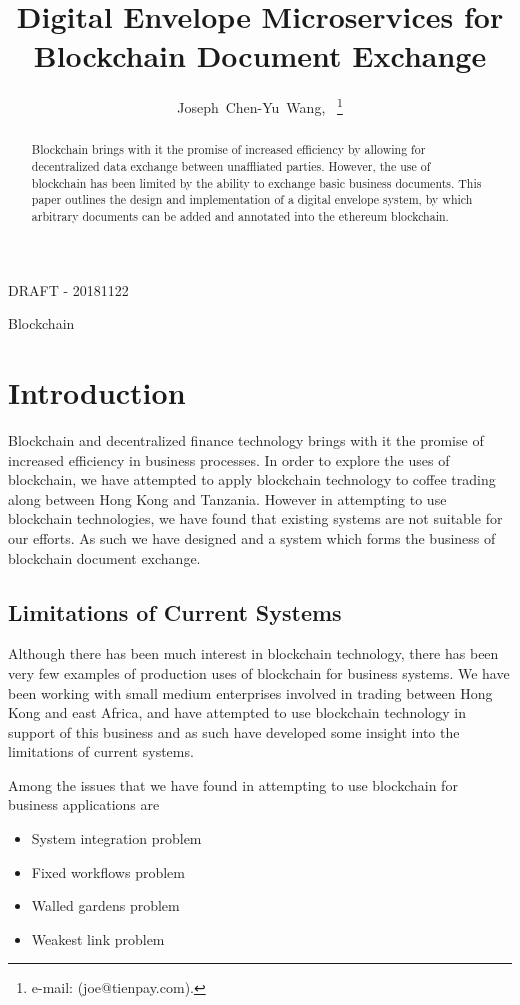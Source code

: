 \documentclass[journal]{IEEEtran}
\begin{document}
\title{Digital Envelope Microservices for Blockchain Document Exchange}
\author{Joseph~Chen-Yu~Wang,~
\thanks{e-mail: (joe@tienpay.com).}}
\maketitle

DRAFT - 20181122

\begin{abstract}
Blockchain brings with it the promise of increased efficiency by
allowing for decentralized data exchange between unaffliated parties.
However, the use of blockchain has been limited by the ability to
exchange basic business documents.  This paper outlines the design and
implementation of a digital envelope system, by which arbitrary
documents can be added and annotated into the ethereum blockchain.
\end{abstract}


\begin{IEEEkeywords}
Blockchain
\end{IEEEkeywords}

\section{Introduction}
Blockchain and decentralized finance technology brings with it the
promise of increased efficiency in business processes.  In order to
explore the uses of blockchain, we have attempted to apply blockchain
technology to coffee trading along between Hong Kong and Tanzania.
However in attempting to use blockchain technologies, we have found
that existing systems are not suitable for our efforts.  As such we
have designed and a system which forms the business of blockchain
document exchange.

\subsection{Limitations of Current Systems}

Although there has been much interest in blockchain technology, there
has been very few examples of production uses of blockchain for
business systems.  We have been working with small medium enterprises
involved in trading between Hong Kong and east Africa, and have
attempted to use blockchain technology in support of this business and
as such have developed some insight into the limitations of current
systems.

Among the issues that we have found in attempting to use blockchain
for business applications are
\begin{itemize}
 \item System integration problem
 \item Fixed workflows problem
 \item Walled gardens problem
 \item Weakest link problem
\end{itemize}
\end{document}
